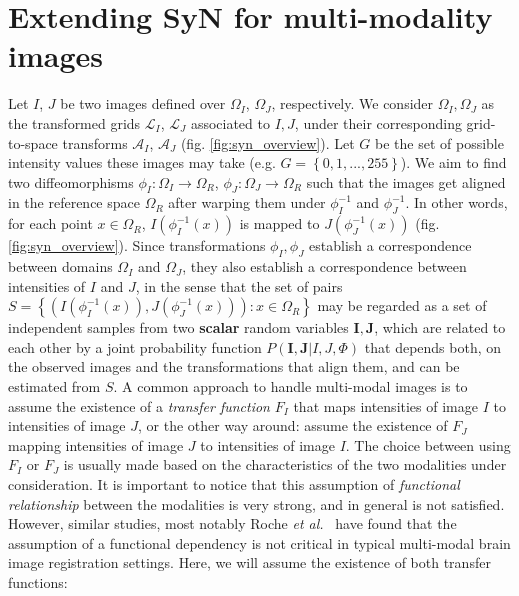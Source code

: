 \section{Extending SyN for multi-modality images}\label{sec:syn_em}

Let $I$, $J$ be two images defined over $\Omega_{I}$, $\Omega_{J}$, respectively. We consider $\Omega_{I}, \Omega_{J}$ as the transformed grids $\mathcal{L}_{I}$, $\mathcal{L}_{J}$
associated to $I, J$, under their corresponding grid-to-space transforms $\mathcal{A}_{I}$, $\mathcal{A}_{J}$ (fig. \ref{fig:syn_overview}). Let $G$ be the set of possible intensity values these images may take (e.g. $G=\left\lbrace 0,1,...,255\right\rbrace$). We aim to find two diffeomorphisms $\phi_{I}:\Omega_{I}\rightarrow \Omega_{R}$, $\phi_{J}:\Omega_{J}\rightarrow \Omega_{R}$ such that the images get aligned in the reference space $\Omega_{R}$ after warping them under $\phi_{I}^{-1}$ and $\phi_{J}^{-1}$. In other words, for each point $x \in \Omega_{R}$, $I(\phi_{I}^{-1}(x))$ is mapped to $J(\phi_{J}^{-1}(x))$
(fig. \ref{fig:syn_overview}). Since transformations $\phi_{I}, \phi_{J}$ establish a correspondence between domains $\Omega_{I}$ and $\Omega_{J}$, they also establish a correspondence between intensities of $I$ and $J$, in the sense that the set of pairs $S = \left\lbrace \left( I(\phi_{I}^{-1}(x)), J(\phi_{J}^{-1}(x))\right): x\in\Omega_{R}\right\rbrace$ may be regarded as a set of independent samples from two \textbf{scalar} random variables $\mathbf{I}, \mathbf{J}$, which are related to each other by a joint probability function $P(\mathbf{I}, \mathbf{J} | I, J, \Phi)$ that depends both, on the observed images and the transformations that align them, and can be estimated from $S$. A common approach to handle multi-modal images is to assume the existence of a \emph{transfer function} $F_{I}$ that maps intensities of image $I$ to intensities of image $J$, or the other way around: assume the existence of $F_{J}$ mapping intensities of image $J$ to intensities of image $I$. The choice between using $F_{I}$ or $F_{J}$ is usually made based on the characteristics of the two modalities under consideration. It is important to notice that this assumption of \emph{functional relationship} between the modalities is very strong, and in general is not satisfied. However, similar studies, most notably Roche {\it et al.}~\cite{Roche1998} have found that the assumption of a functional dependency is not critical in typical multi-modal brain image registration settings. Here, we will assume the existence of both transfer functions:
